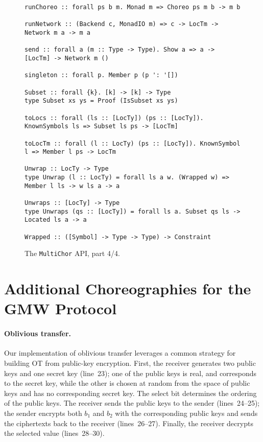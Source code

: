 \documentclass[sigplan,screen,review,anonymous]{acmart}
\newcommand{\MultiChor}{\texttt{Multi\-Chor}\xspace}
\begin{document}
\begin{figure*}\ContinuedFloat
\begin{mdframed}
\begin{verbatim}
runChoreo :: forall ps b m. Monad m => Choreo ps m b -> m b

runNetwork :: (Backend c, MonadIO m) => c -> LocTm -> Network m a -> m a

send :: forall a (m :: Type -> Type). Show a => a -> [LocTm] -> Network m ()

singleton :: forall p. Member p (p ': '[])

Subset :: forall {k}. [k] -> [k] -> Type
type Subset xs ys = Proof (IsSubset xs ys)

toLocs :: forall (ls :: [LocTy]) (ps :: [LocTy]). KnownSymbols ls => Subset ls ps -> [LocTm]

toLocTm :: forall (l :: LocTy) (ps :: [LocTy]). KnownSymbol l => Member l ps -> LocTm

Unwrap :: LocTy -> Type
type Unwrap (l :: LocTy) = forall ls a w. (Wrapped w) => Member l ls -> w ls a -> a

Unwraps :: [LocTy] -> Type
type Unwraps (qs :: [LocTy]) = forall ls a. Subset qs ls -> Located ls a -> a

Wrapped :: ([Symbol] -> Type -> Type) -> Constraint
\end{verbatim}
\caption{The \MultiChor API, part 4/4.}
\end{mdframed}
\end{figure*}



\section{Additional Choreographies for the GMW Protocol}
\label{sec:gmw_appendix}

\paragraph{Oblivious transfer.}
Our implementation of oblivious transfer leverages a common strategy for building OT from public-key encryption. First, the receiver generates two public keys and one secret key (line~23); one of the public keys is real, and corresponds to the secret key, while the other is chosen at random from the space of public keys and has no corresponding secret key. The select bit determines the ordering of the public keys. The receiver sends the public keys to the sender (lines~24--25); the sender encrypts both $b_1$ and $b_2$ with the corresponding public keys and sends the ciphertexts back to the receiver (lines~26--27). Finally, the receiver decrypts the selected value (lines~28--30).
\end{document}
